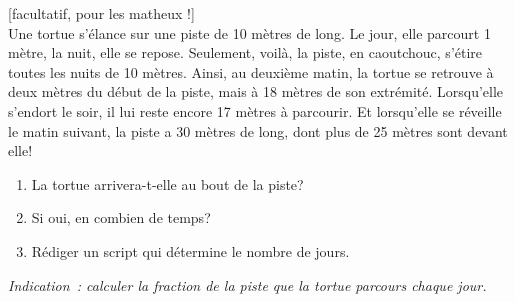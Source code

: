 \documentclass[a4paper,12pt]{article}
\newcommand{\numero}{9}                                    %
\begin{document}
\exo{}[facultatif, pour les matheux !]  ~\\ 
Une tortue s'élance sur une piste de 10 mètres de long. Le jour, elle parcourt 1 mètre, la nuit, elle se repose.
\vspace{3mm}
Seulement, voilà, la piste, en caoutchouc, s'étire toutes les nuits de 10 mètres. Ainsi, au deuxième matin, la tortue se retrouve à deux mètres du début de la piste, mais à 18 mètres de son extrémité. Lorsqu'elle s'endort le soir, il lui reste encore 17 mètres à parcourir. 
\vspace{3mm}
Et lorsqu'elle se réveille le matin suivant, la piste a 30 mètres de long, dont plus de 25 mètres sont devant elle!
\begin{enumerate}
	\item La tortue arrivera-t-elle au bout de la piste?
	\item Si oui, en combien de temps?
	\item Rédiger un script qui détermine le nombre de jours.
\end{enumerate}

\textit{Indication : calculer la fraction de la piste que la tortue parcours chaque jour.}


\finexo

\cleardoublepage


		\newpage
		\setcounter{page}{1}
		\setcounter{section}{\numero}
		

		\section{}
	
\end{document}
